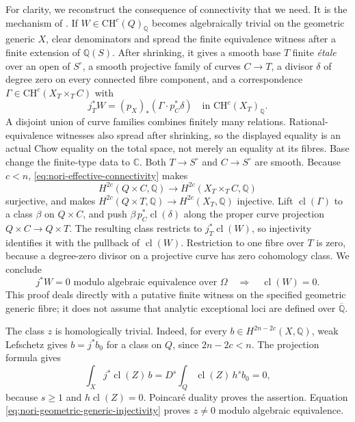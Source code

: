 For clarity, we reconstruct the consequence of connectivity that
we need. It is the mechanism of
\citet[Theorem 1, pp.~349--350 and Sections 5--6]{cyNori1993}.
If $W\in\mathrm{CH}^c(Q)_{\mathbb Q}$ becomes algebraically
trivial on the geometric generic $X$, clear denominators and
spread the finite equivalence witness after a finite extension
of $\mathbb Q(S)$. After shrinking, it gives a smooth base
$T$ finite \emph{\'etale} over an open of $S^\circ$, a smooth
projective family of curves $C\to T$, a divisor $\delta$ of
degree zero on every connected fibre component, and a
correspondence $\Gamma\in\mathrm{CH}^c(X_T\times_T C)$ with
\[
       j_T^*W=(p_X)_*(\Gamma\cdot p_C^*\delta)
                   \quad\text{in }\mathrm{CH}^c(X_T)_{\mathbb Q}.
\]
A disjoint union of curve families combines finitely many
relations. Rational-equivalence witnesses also spread after
shrinking, so the displayed equality is an actual Chow equality
on the total space, not merely an equality at its fibres.
Base change the finite-type data to $\mathbb C$. Both
$T\to S^\circ$ and $C\to S^\circ$ are smooth. Because $c<n$,
\eqref{eq:nori-effective-connectivity} makes
\[
 H^{2c}(Q\times C,\mathbb Q)
         \longrightarrow H^{2c}(X_T\times_T C,\mathbb Q)
\]
surjective, and makes
$H^{2c}(Q\times T,\mathbb Q)\to H^{2c}(X_T,\mathbb Q)$
injective. Lift $\operatorname{cl}(\Gamma)$ to a class $\beta$
on $Q\times C$, and push $\beta\,p_C^*\operatorname{cl}(\delta)$
along the proper curve projection $Q\times C\to Q\times T$.
The resulting class restricts to $j_T^*\operatorname{cl}(W)$,
so injectivity identifies it with the pullback of
$\operatorname{cl}(W)$. Restriction to one fibre over $T$ is
zero, because a degree-zero divisor on a projective curve has
zero cohomology class. We conclude
\begin{equation}\label{eq:nori-geometric-generic-injectivity}
 j^*W=0\text{ modulo algebraic equivalence over }\Omega
       \quad\Longrightarrow\quad\operatorname{cl}(W)=0.
\end{equation}
This proof deals directly with a putative finite witness on the
specified geometric generic fibre; it does not assume that
analytic exceptional loci are defined over $\overline{\mathbb Q}$.

The class $z$ is homologically trivial. Indeed, for every
$b\in H^{2n-2c}(X,\mathbb Q)$, weak Lefschetz gives
$b=j^*b_0$ for a class on $Q$, since $2n-2c<n$.
The projection formula gives
\[
 \int_X j^*\operatorname{cl}(Z)\,b
       =D^s\int_Q\operatorname{cl}(Z)\,h^s b_0=0,
\]
because $s\ge1$ and $h\operatorname{cl}(Z)=0$.
Poincar\'e duality proves the assertion. Equation
\eqref{eq:nori-geometric-generic-injectivity} proves $z\ne0$
modulo algebraic equivalence.

